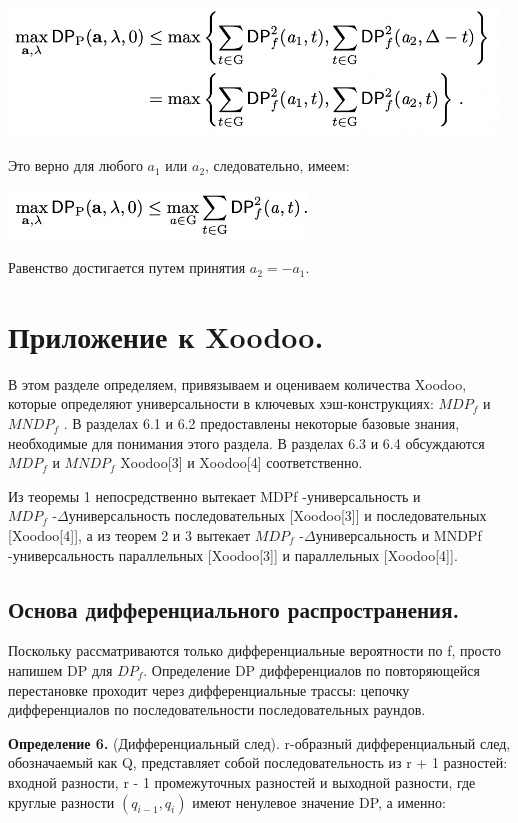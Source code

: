 \documentclass[utf8,14pt,a4paper,oneside,russian]{book}
\begin{document}
\includegraphics[width=13cm]{form19}

Это верно для любого $a_1$ или $a_2$, следовательно, имеем:

\includegraphics[width=8cm]{form20}

Равенство достигается путем принятия $a_2 = -a_1$.

\section{Приложение к Xoodoo.}

В этом разделе определяем, привязываем и оцениваем количества Xoodoo,\\ 
которые определяют универсальности в ключевых хэш-конструкциях: 
$MDP_f$ и $MNDP_f$ . В разделах 6.1 и 6.2 предоставлены некоторые базовые 
знания, необходимые для понимания этого раздела. В разделах 6.3 и 6.4 
обсуждаются $MDP_f$ и $MNDP_f$ Xoodoo[3] и Xoodoo[4] соответственно.

Из теоремы 1 непосредственно вытекает MDPf -универсальность и\\
$MDP_f$ -$\Delta$универсальность последовательных [Xoodoo[3]] и последовательных 
[Xoodoo[4]], а из теорем 2 и 3 вытекает $MDP_f$ -$\Delta$универсальность и 
MNDPf -универсальность параллельных [Xoodoo[3]] и параллельных [Xoodoo[4]].

\subsection{Основа дифференциального распространения.}

Поскольку рассматриваются только дифференциальные вероятности по f, 
просто напишем DP для $DP_f$. Определение DP дифференциалов по повторяющейся 
перестановке проходит через дифференциальные трассы: цепочку дифференциалов 
по последовательности последовательных раундов.

\textbf{Определение 6.} (Дифференциальный след). r-образный дифференциальный 
след, обозначаемый как Q, представляет собой последовательность из r + 1 
разностей: входной разности, r - 1 промежуточных разностей и выходной 
разности, где круглые разности $(q_{i-1},q_i)$ имеют ненулевое 
значение DP, а именно:
\end{document}
